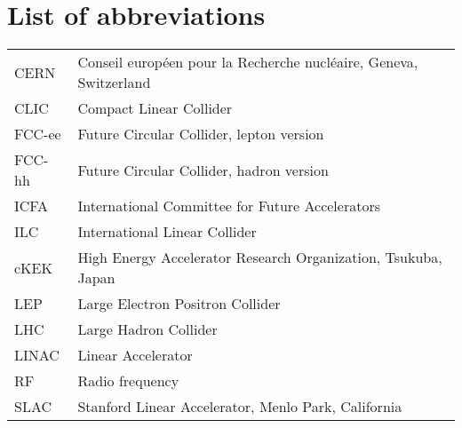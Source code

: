 \chapter*{List of abbreviations}

\begin{tabular}{l l}
CERN	&	Conseil europ\'een pour la Recherche nucl\'eaire, Geneva, Switzerland\\
CLIC		&	Compact Linear Collider\\
FCC-ee	&	Future Circular Collider, lepton version\\
FCC-hh	&	Future Circular Collider, hadron version\\
ICFA		&	International Committee for Future Accelerators\\
ILC		&	International Linear Collider\\
cKEK		&	High Energy Accelerator Research Organization, Tsukuba, Japan      \\  
LEP		&	Large Electron Positron Collider\\
LHC		&	Large Hadron Collider \\
LINAC	&	Linear Accelerator\\
RF		&	Radio frequency\\
SLAC	&	Stanford Linear Accelerator, Menlo Park, California\\
\end{tabular}